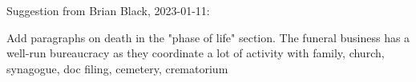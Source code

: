 Suggestion from Brian Black, 2023-01-11:

Add paragraphs on death in the "phase of life" section. The funeral business has a well-run bureaucracy as they coordinate a lot of activity with family, church, synagogue, doc filing, cemetery, crematorium